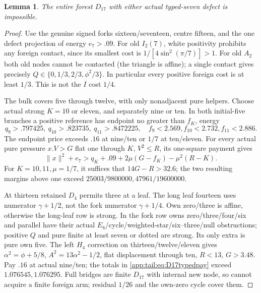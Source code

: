 \documentclass[11pt]{article}
\newtheorem{lemma}[theorem]{Lemma}
\theoremstyle{definition}
\theoremstyle{remark}
\newcommand{\norm}[1]{\lVert #1\rVert}
\begin{document}
\begin{lemma}\label{app:tail:lem:D17typed}
The entire forest $D_{17}$ with either actual typed-seven defect
is impossible.
\end{lemma}
\begin{proof}
Use the genuine signed forks sixteen/seventeen, centre fifteen,
and the one defect projection of energy $e_7>.09$.
For old $I_2(7)$, white positivity prohibits any foreign contact,
since its smallest cost is $1/[4\sin^2(\pi/7)]>1$.
For old $A_2$ both old nodes cannot be contacted (the triangle
is affine); a single contact gives precisely
$Q\in\{0,1/3,2/3,\phi^2/3\}$.
In particular every positive foreign cost is at least $1/3$.
This is not the $I$ cost $1/4$.

The bulk covers five through twelve, with only nonadjacent pure
helpers. Choose actual strong $K=10$ or eleven, and separately
nine or ten. In both initial-five branches a positive reference
has endpoint no greater than $f_K$, energy
\[
 q_9>.797425,\ q_{10}>.823735,\ q_{11}>.8472225,
 \quad f_9<2.569,f_{10}<2.732,f_{11}<2.886.
\]
The endpoint price exceeds $.16$ at nine/ten or $1/7$ at
ten/eleven. For every actual pure pressure $x.V>G$ flat one
through $K$, $V^2\le R$, its one-square payment gives
\begin{equation}\label{app:tail:eq:D17typedpay}
 \norm x^2+e_7>q_K+.09+2\mu(G-f_K)-\mu^2(R-K).
\end{equation}
For $K=10,11,\mu=1/7$, it suffices that $14G-R>32.6$;
the two resulting margins above one exceed
$25003/9800000,47961/19600000$.

At thirteen retained $D_4$ permits three at a leaf.
The long leaf fourteen uses numerator $\gamma+1/2$, not
the fork numerator $\gamma+1/4$. Own zero/three is affine,
otherwise the long-leaf row is strong. In the fork row
owns zero/three/four/six and parallel have their actual
$E_8$/cycle/weighted-star/six--three/null obstructions;
positive $Q$ and pure finite at least seven or dotted are
strong. Its only extra is pure own five.
The left $H_4$ correction on thirteen/twelve/eleven gives
$\alpha^2=\phi+5/8$, $A^2=13\alpha^2-1/2$, flat
displacement through ten, $R<13$, $G>3.48$.
Pay $.16$ at actual nine/ten; the totals in
\eqref{app:tail:eq:D17typedpay} exceed $1.076545,1.076295$.
Full bridges are finite $D_{17}$ with internal new node,
so cannot acquire a finite foreign arm; residual $1/26$
and the own-zero cycle cover them.


\end{proof}
\end{document}
